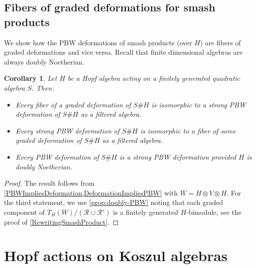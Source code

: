 \documentclass[11pt]{amsart}
\numberwithin{equation}{section}
\newtheorem{cor}[equation]{Corollary}
\newcommand{\R}{\mathcal{R}}
\renewcommand{\_}[1]{\mbox{$_{\left( #1 \right)}$}}
\newcommand{\ot}{\otimes}
\newcommand{\Ho}{H}%
\begin{document}
{ 
 \vspace{1ex}
 
 \subsection*{Fibers of graded deformations for smash products}
We show how the PBW deformations of smash products (over $H$)
are fibers of graded deformations and vice versa.
Recall that finite dimensional algebras are always doubly Noetherian.

\vspace{1ex}

 \begin{cor}\label{PBW-iff-deformation}
   Let $\Ho$ be a Hopf algebra acting on a finitely
   generated
    quadratic algebra $S$. Then: 
   \begin{itemize}
   \item Every fiber
of a graded deformation of $S\# \Ho$ is isomorphic 
     to a strong PBW deformation of $S\# \Ho$ as a filtered algebra. 
     \item 
   Every strong PBW deformation of $S\#\Ho$ is isomorphic to a fiber of some 
   graded deformation of $S\#\Ho$ as a filtered algebra.
        \item 
          Every PBW deformation of $S\#\Ho$ is a strong PBW deformation
          provided $H$ is 
   doubly Noetherian.
   \end{itemize}
 \end{cor}
 \begin{proof}
The result follows from  \cref{PBWImpliesDeformation,DeformationImpliesPBW}
with $W=H\ot V \ot H$.
For the third statement, we use
\cref{prop:doubly-PBW}
noting that each
graded component of $T_{H}(W)/(\R\cup \R')$
is a finitely generated $H$-bimodule,
see the proof of \cref{RewritingSmashProduct}.
   \end{proof}
 

   

\section{Hopf actions on Koszul algebras}\label{sec:actions-on-Koszul}



}
\end{document}
